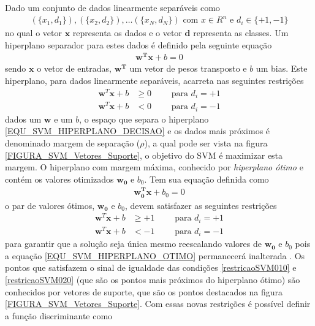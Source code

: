 Dado um conjunto de dados linearmente separáveis como
\begin{align}
(\{x_{1}, d_{1}\}), (\{x_{2}, d_{2}\}), \ldots (\{x_{N}, d_{N}\}) \text{ com } x \in R^{n} \text{ e } d_{i} \in \{+1, -1\}
\end{align}
no qual o vetor \(\mathbf{x}\) representa os dados e o vetor \(\mathbf{d}\) representa as classes. Um hiperplano separador para estes dados é definido pela seguinte equação
\begin{align}
\mathbf{w^{T}}\mathbf{x} + b = 0 		\label{EQU_SVM_HIPERPLANO_DECISAO}
\end{align}
sendo \(\mathbf{x}\) o vetor de entradas, \(\mathbf{w^{T}} \) um vetor de pesos transposto e \(b\) um bias. Este hiperplano, para dados linearmente separáveis, acarreta nas seguintes restrições
\begin{align}
\mathbf{w}^{T}\mathbf{x} + b &\geq 0  	\qquad \textrm{ para } d_{i} = +1 \label{restricaoSVM01} \\
\mathbf{w}^{T}\mathbf{x} + b &< 0		\qquad \textrm{ para } d_{i} = -1 \label{restricaoSVM02}
\end{align}
dados um \(\mathbf{w}\) e um \(b\), o espaço que separa o hiperplano \eqref{EQU_SVM_HIPERPLANO_DECISAO} e os dados mais próximos é denominado margem de separação (\(\rho\)), a qual pode ser vista na figura \ref{FIGURA_SVM_Vetores_Suporte}, o objetivo do SVM é maximizar esta margem. O hiperplano com margem máxima, conhecido por \emph{hiperplano ótimo} e contém os valores otimizados \(\mathbf{w_{0}}\) e \(b_{0}\). Tem sua equação definida como
\begin{align}
\mathbf{w^{T}_{0}}\mathbf{x} + b_{0} = 0 								\label{EQU_SVM_HIPERPLANO_OTIMO}
\end{align}
o par de valores ótimos, \(\mathbf{w_{0}}\) e \(b_{0}\), devem satisfazer as seguintes restrições
\begin{align}
\mathbf{w}^{T}\mathbf{x} + b &\geq +1  	\qquad \textrm{ para } d_{i} = +1 \label{restricaoSVM010} \\
\mathbf{w}^{T}\mathbf{x} + b &< -1		\qquad \textrm{ para } d_{i} = -1 \label{restricaoSVM020}
\end{align}
para garantir que a solução seja única mesmo reescalando valores de \(\mathbf{w_{0}}\) e \(b_{0}\) pois a equação \eqref{EQU_SVM_HIPERPLANO_OTIMO} permanecerá inalterada \cite{LIMA2004}. Os pontos que satisfazem o sinal de igualdade das condições \eqref{restricaoSVM010} e \eqref{restricaoSVM020} (que são os pontos mais próximos do hiperplano ótimo) são conhecidos por vetores de suporte, que são os pontos destacados na figura \ref{FIGURA_SVM_Vetores_Suporte}. Com essas novas restrições é possível definir a função discriminante como
